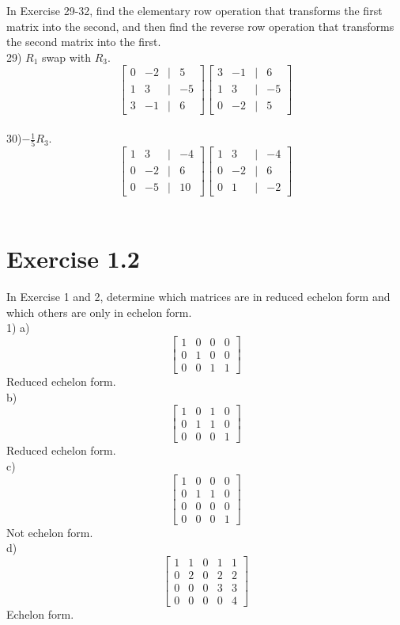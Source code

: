 \documentclass[]{article}
\begin{document}
In Exercise 29-32, find the elementary row operation that transforms the first matrix into the second, and then find the reverse row operation that transforms the second matrix into the first.\\

29) $R_1$ swap with $R_3$.\\
\[
\begin{bmatrix}
0&-2&|&5\\
1&3&|&-5\\
3&-1&|&6
\end{bmatrix}
\begin{bmatrix}
3&-1&|&6\\
1&3&|&-5\\
0&-2&|&5
\end{bmatrix}
\]\\


30)$-\frac{1}{5}R_3$.\\
\[
\begin{bmatrix}
1&3&|&-4\\
0&-2&|&6\\
0&-5&|&10
\end{bmatrix}
\begin{bmatrix}
1&3&|&-4\\
0&-2&|&6\\
0&1&|&-2
\end{bmatrix}
\]\\

\section{Exercise 1.2}

In Exercise 1 and 2, determine which matrices are in reduced echelon form and which others are only in echelon form.\\

1) a) \[
\begin{bmatrix}
1&0&0&0\\
0&1&0&0\\
0&0&1&1
\end{bmatrix}
\]
Reduced echelon form.\\

b) \[
\begin{bmatrix}
1&0&1&0\\
0&1&1&0\\
0&0&0&1
\end{bmatrix}
\]
Reduced echelon form.\\

c) \[
\begin{bmatrix}
1&0&0&0\\
0&1&1&0\\
0&0&0&0\\
0&0&0&1
\end{bmatrix}
\]
Not echelon form.\\

d) \[
\begin{bmatrix}
1&1&0&1&1\\
0&2&0&2&2\\
0&0&0&3&3\\
0&0&0&0&4
\end{bmatrix}
\]
Echelon form.\\
\end{document}
